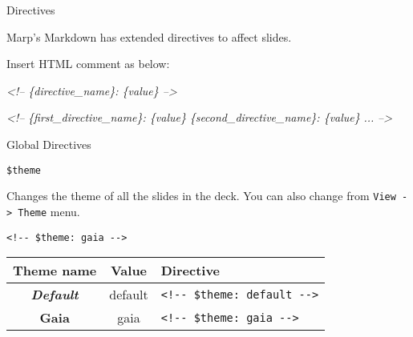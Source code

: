 \documentclass[ignorenonframetext,]{beamer}
\newenvironment{Shaded}{\begin{snugshade}}{\end{snugshade}}
\newcommand{\CommentTok}[1]{\textcolor[rgb]{0.56,0.35,0.01}{\textit{{#1}}}}
\begin{document}
\begin{frame}[fragile]{Directives}

Marp's Markdown has extended directives to affect slides.

Insert HTML comment as below:

\begin{Shaded}
\begin{Highlighting}[]
\CommentTok{<!-- \{directive_name\}: \{value\} -->}
\end{Highlighting}
\end{Shaded}

\begin{Shaded}
\begin{Highlighting}[]
\CommentTok{<!--}
\CommentTok{\{first_directive_name\}:  \{value\}}
\CommentTok{\{second_directive_name\}: \{value\}}
\CommentTok{...}
\CommentTok{-->}
\end{Highlighting}
\end{Shaded}

\end{frame}

\begin{frame}[fragile]

\begin{block}{Global Directives}

\begin{block}{\texttt{\$theme}}

Changes the theme of all the slides in the deck. You can also change
from \texttt{View\ -\textgreater{}\ Theme} menu.

\begin{verbatim}
<!-- $theme: gaia -->
\end{verbatim}

\begin{longtable}[c]{@{}ccl@{}}
\toprule
Theme name & Value & Directive\tabularnewline
\midrule
\endhead
\textbf{\emph{Default}} & default &
\texttt{\textless{}!-\/-\ \$theme:\ default\ -\/-\textgreater{}}\tabularnewline
\textbf{Gaia} & gaia &
\texttt{\textless{}!-\/-\ \$theme:\ gaia\ -\/-\textgreater{}}\tabularnewline
\bottomrule
\end{longtable}

\end{block}

\end{block}

\end{frame}
\end{document}
